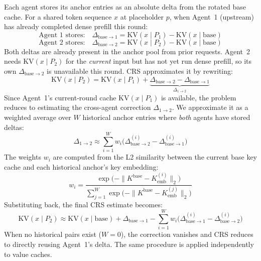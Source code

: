 Each agent stores its anchor entries as an absolute delta from the
rotated base cache.  For a shared token sequence $x$ at placeholder $p$,
when Agent~1 (upstream) has already completed dense prefill this round:
%
\begin{equation}
  \text{Agent 1 stores:}\quad \Delta_{\text{base}\to 1} = \mathrm{KV}(x \mid P_1) - \mathrm{KV}(x \mid \text{base})
  \label{eq:crs-delta1}
\end{equation}
%
\begin{equation}
  \text{Agent 2 stores:}\quad \Delta_{\text{base}\to 2} = \mathrm{KV}(x \mid P_2) - \mathrm{KV}(x \mid \text{base})
  \label{eq:crs-delta2}
\end{equation}
%
Both deltas are already present in the anchor pool from prior requests.
Agent~2 needs $\mathrm{KV}(x \mid P_2)$ for the \emph{current} input
but has not yet run dense prefill, so its own
$\Delta_{\text{base}\to 2}$ is unavailable this round.  CRS
approximates it by rewriting:
%
\begin{equation}
  \mathrm{KV}(x \mid P_2) = \mathrm{KV}(x \mid P_1) + \underbrace{\Delta_{\text{base}\to 2} - \Delta_{\text{base}\to 1}}_{\displaystyle \Delta_{1\to 2}}
  \label{eq:crs-rewrite}
\end{equation}
%
Since Agent~1's current-round cache $\mathrm{KV}(x \mid P_1)$ is
available, the problem reduces to estimating the cross-agent correction
$\Delta_{1\to 2}$.  We approximate it as a weighted average over $W$
historical anchor entries where \emph{both} agents have stored deltas:
%
\begin{equation}
  \Delta_{1 \to 2} \approx \sum_{i=1}^{W} w_i \bigl(\Delta_{\text{base}\to 2}^{(i)} - \Delta_{\text{base}\to 1}^{(i)}\bigr)
  \label{eq:crs-cross}
\end{equation}
%
The weights $w_i$ are computed from the L2 similarity between the
current base key cache and each historical anchor's key embedding:
%
\begin{equation}
  w_i = \frac{\exp\!\bigl(-\|K^{\text{base}} - K^{(i)}_{\text{emb}}\|_2\bigr)}{\sum_{j=1}^{W} \exp\!\bigl(-\|K^{\text{base}} - K^{(j)}_{\text{emb}}\|_2\bigr)}
  \label{eq:crs-weights}
\end{equation}
%
Substituting back, the final CRS estimate becomes:
%
\begin{equation}
  \mathrm{KV}(x \mid P_2) \approx \mathrm{KV}(x \mid \text{base}) + \Delta_{\text{base}\to 1} - \sum_{i=1}^{W} w_i \bigl(\Delta_{\text{base}\to 1}^{(i)} - \Delta_{\text{base}\to 2}^{(i)}\bigr)
  \label{eq:crs-final}
\end{equation}
%
When no historical pairs exist ($W = 0$), the correction vanishes and
CRS reduces to directly reusing Agent~1's delta.  The same procedure is
applied independently to value caches.

